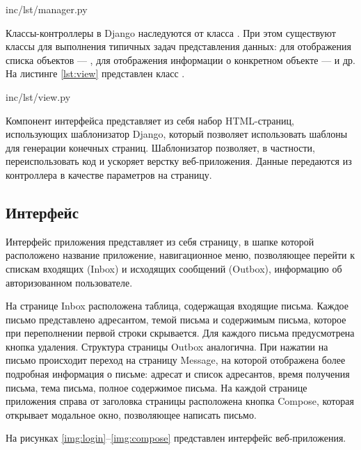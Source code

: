  {inc/lst/manager.py}

Классы-контроллеры в Django наследуются от класса . При этом существуют классы для выполнения типичных задач представления данных: для отображения списка объектов --- , для отображения информации о конкретном объекте ---  и др. На листинге \ref{lst:view} представлен класс .

 {inc/lst/view.py}

Компонент интерфейса представляет из себя набор HTML-страниц, использующих шаблонизатор Django, который позволяет использовать шаблоны для генерации конечных страниц. Шаблонизатор позволяет, в частности, переиспользовать код и ускоряет верстку веб-приложения. Данные передаются из контроллера в качестве параметров на страницу.

\subsection{Интерфейс}

Интерфейс приложения представляет из себя страницу, в шапке которой расположено название приложение, навигационное меню, позволяющее перейти к спискам входящих (Inbox) и исходящих сообщений (Outbox), информацию об авторизованном пользователе.

На странице Inbox расположена таблица, содержащая входящие письма. Каждое письмо представлено адресантом, темой письма и содержимым письма, которое при переполнении первой строки скрывается. Для каждого письма предусмотрена кнопка удаления. Структура страницы Outbox аналогична. При нажатии на письмо происходит переход на страницу Message, на которой отображена более подробная информация о письме: адресат и список адресантов, время получения письма, тема письма, полное содержимое письма. На каждой странице приложения справа от заголовка страницы расположена кнопка Compose, которая открывает модальное окно, позволяющее написать письмо.

На рисунках \ref{img:login}--\ref{img:compose} представлен интерфейс веб-приложения.



